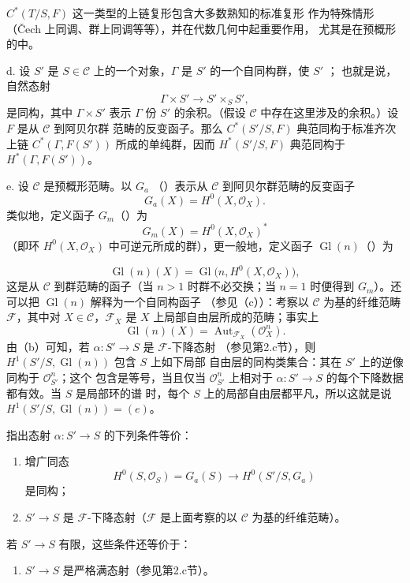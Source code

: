  $C^*(T/S,F)$ 这一类型的上链复形包含大多数熟知的标准复形
作为特殊情形（Čech 上同调、群上同调等等），并在代数几何中起重要作用，
尤其是在预概形的中。

\medskip\noindent
d.  设 $S'$ 是 $S\in\mathcal C$ 上的一个对象，$\Gamma$ 是
$S'$ 的一个自同构群，使 $S'$ ；
也就是说，自然态射
\[
  \Gamma\times S'\longrightarrow S'\times_SS',
\]
是同构，其中 $\Gamma\times S'$ 表示 $\Gamma$ 份 $S'$ 的余积。（假设
$\mathcal C$ 中存在这里涉及的余积。）设 $F$ 是从 $\mathcal C$ 到阿贝尔群
范畴的反变函子。那么 $C^*(S'/S,F)$ 典范同构于标准齐次上链
$C^*(\Gamma,F(S'))$ 所成的单纯群，因而 $H^*(S'/S,F)$ 典范同构于
$H^*(\Gamma,F(S'))$。

\medskip\noindent
e.  设 $\mathcal C$ 是预概形范畴。以 $G_a$
（）表示从 $\mathcal C$ 到阿贝尔群范畴的反变函子
\[
  G_a(X)=H^0(X,\mathcal O_X).
\]
类似地，定义函子 $G_m$（）为
\[
  G_m(X)=H^0(X,\mathcal O_X)^*
\]
（即环 $H^0(X,\mathcal O_X)$ 中可逆元所成的群），更一般地，定义函子
$\operatorname{Gl}(n)$（）为

\[
  \operatorname{Gl}(n)(X)=
  \operatorname{Gl}\bigl(n,H^0(X,\mathcal O_X)\bigr),
\]
这是从 $\mathcal C$ 到群范畴的函子（当 $n>1$ 时群不必交换；当 $n=1$
时便得到 $G_m$）。还可以把 $\operatorname{Gl}(n)$ 解释为一个自同构函子
（参见（c））：考察以 $\mathcal C$ 为基的纤维范畴 $\mathcal F$，其中对
$X\in\mathcal C$，$\mathcal F_X$ 是 $X$ 上局部自由层所成的范畴；事实上
\[
  \operatorname{Gl}(n)(X)=
  \operatorname{Aut}_{\mathcal F_X}(\mathcal O_X^n).
\]
由（b）可知，若 $\alpha:S'\longrightarrow S$ 是 $\mathcal F$-下降态射
（参见第2.c节），则 $H^1(S'/S,\operatorname{Gl}(n))$ 包含 $S$ 上如下局部
自由层的同构类集合：其在 $S'$ 上的逆像同构于 $\mathcal O_{S'}^n$；这个
包含是等号，当且仅当 $\mathcal O_{S'}^n$ 上相对于
$\alpha:S'\longrightarrow S$ 的每个下降数据都有效。当 $S$ 是局部环的谱
时，每个 $S$ 上的局部自由层都平凡，所以这就是说
$H^1(S'/S,\operatorname{Gl}(n))=(e)$。

指出态射 $\alpha:S'\longrightarrow S$ 的下列条件等价：
\begin{enumerate}
\item[(i)] 增广同态
\[
  H^0(S,\mathcal O_S)=G_a(S)\longrightarrow H^0(S'/S,G_a)
\]
是同构；
\item[(ii)] $S'\longrightarrow S$ 是 $\mathcal F$-下降态射（$\mathcal F$
是上面考察的以 $\mathcal C$ 为基的纤维范畴）。
\end{enumerate}
若 $S'\longrightarrow S$ 有限，这些条件还等价于：
\begin{enumerate}
\item[(iii)] $S'\longrightarrow S$ 是严格满态射（参见第2.c节）。
\end{enumerate}

